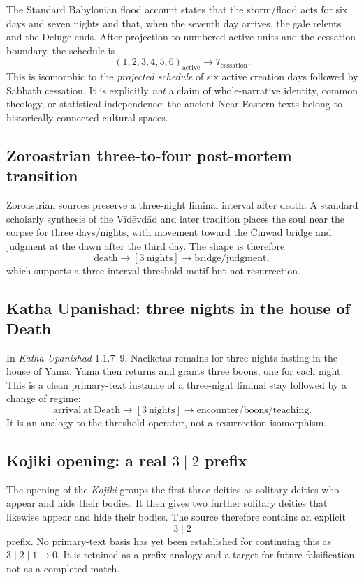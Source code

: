 The Standard Babylonian flood account states that the storm/flood acts for six
days and seven nights and that, when the seventh day arrives, the gale relents
and the Deluge ends.  After projection to numbered active units and the
cessation boundary, the schedule is
\[
(1,2,3,4,5,6)_{\mathrm{active}}\to7_{\mathrm{cessation}}.
\]
This is isomorphic to the \emph{projected schedule} of six active creation days
followed by Sabbath cessation.  It is explicitly \emph{not} a claim of
whole-narrative identity, common theology, or statistical independence; the
ancient Near Eastern texts belong to historically connected cultural spaces.

\subsection{Zoroastrian three-to-four post-mortem transition}

Zoroastrian sources preserve a three-night liminal interval after death.  A
standard scholarly synthesis of the V\={i}d\={e}vd\={a}d and later tradition
places the soul near the corpse for three days/nights, with movement toward the
\v{C}inwad bridge and judgment at the dawn after the third day.  The shape is
therefore
\[
\mathrm{death}\to[3\ \mathrm{nights}]\to\mathrm{bridge/judgment},
\]
which supports a three-interval threshold motif but not resurrection.

\subsection{Katha Upanishad: three nights in the house of Death}

In \emph{Katha Upanishad} 1.1.7--9, Naciketas remains for three nights fasting
in the house of Yama.  Yama then returns and grants three boons, one for each
night.  This is a clean primary-text instance of a three-night liminal stay
followed by a change of regime:
\[
\mathrm{arrival\ at\ Death}\to[3\ \mathrm{nights}]\to
\mathrm{encounter/boons/teaching}.
\]
It is an analogy to the threshold operator, not a resurrection isomorphism.

\subsection{Kojiki opening: a real \texorpdfstring{$3\mid2$}{3|2} prefix}

The opening of the \emph{Kojiki} groups the first three deities as solitary
deities who appear and hide their bodies.  It then gives two further solitary
deities that likewise appear and hide their bodies.  The source therefore
contains an explicit
\[
3\mid2
\]
prefix.  No primary-text basis has yet been established for continuing this as
$3\mid2\mid1\to0$.  It is retained as a prefix analogy and a target for future
falsification, not as a completed match.

